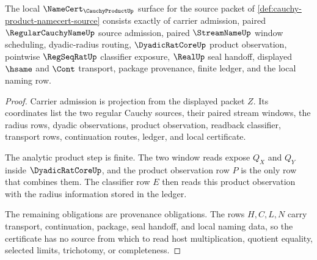 \begin{theorem}
\label{thm:cauchy-product-namecert-obligations}
The local $\NameCert_{\CauchyProductUp}$ surface for the source packet of \autoref{def:cauchy-product-namecert-source} consists exactly of carrier admission, paired $\RegularCauchyNameUp$ source admission, paired $\StreamNameUp$ window scheduling, dyadic-radius routing, $\DyadicRatCoreUp$ product observation, pointwise $\RegSeqRatUp$ classifier exposure, $\RealUp$ seal handoff, displayed $\hsame$ and $\Cont$ transport, package provenance, finite ledger, and the local naming row.
\end{theorem}
\begin{proof}
Carrier admission is projection from the displayed packet $Z$. Its coordinates list the two regular Cauchy sources, their paired stream windows, the radius rows, dyadic observations, product observation, readback classifier, transport rows, continuation routes, ledger, and local certificate.

The analytic product step is finite. The two window reads expose $Q_X$ and $Q_Y$ inside $\DyadicRatCoreUp$, and the product observation row $P$ is the only row that combines them. The classifier row $E$ then reads this product observation with the radius information stored in the ledger.

The remaining obligations are provenance obligations. The rows $H,C,L,N$ carry transport, continuation, package, seal handoff, and local naming data, so the certificate has no source from which to read host multiplication, quotient equality, selected limits, trichotomy, or completeness.
\end{proof}

